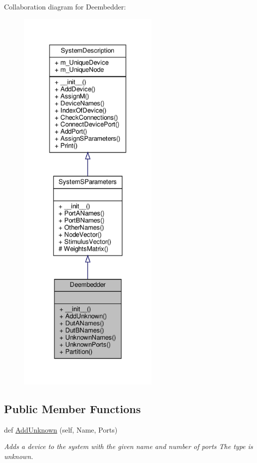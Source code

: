 Collaboration diagram for Deembedder\+:
\nopagebreak
\begin{figure}[H]
\begin{center}
\leavevmode
\includegraphics[height=550pt]{classSignalIntegrity_1_1SystemDescriptions_1_1Deembedder_1_1Deembedder__coll__graph}
\end{center}
\end{figure}
\subsection*{Public Member Functions}
\begin{DoxyCompactItemize}
\item 
def \hyperlink{classSignalIntegrity_1_1SystemDescriptions_1_1Deembedder_1_1Deembedder_a5ce06adeeb4dc8990aede7800d72a081}{Add\+Unknown} (self, Name, Ports)
\begin{DoxyCompactList}\small\item\em Adds a device to the system with the given name and number of ports The type is \textquotesingle{}unknown\textquotesingle{}. \end{DoxyCompactList}\end{DoxyCompactItemize}
